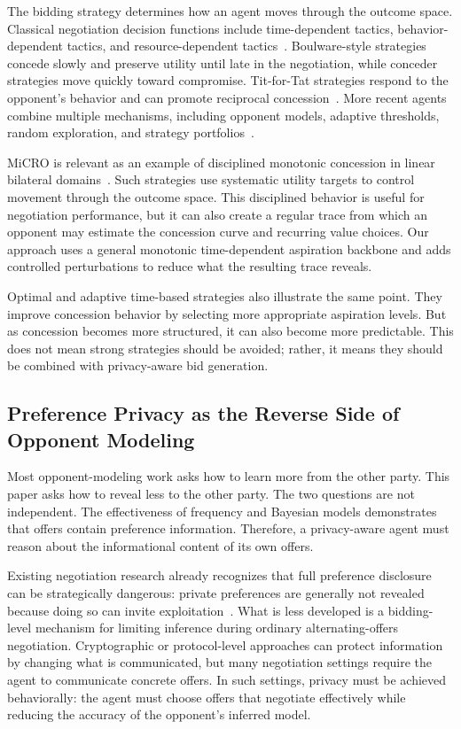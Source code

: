 \documentclass[runningheads]{llncs}
\begin{document}
The bidding strategy determines how an agent moves through the outcome space. Classical negotiation decision functions include time-dependent tactics, behavior-dependent tactics, and resource-dependent tactics~\cite{BasicAgent}. Boulware-style strategies concede slowly and preserve utility until late in the negotiation, while conceder strategies move quickly toward compromise. Tit-for-Tat strategies respond to the opponent's behavior and can promote reciprocal concession~\cite{nice_tit4tat_Baarslag2013}. More recent agents combine multiple mechanisms, including opponent models, adaptive thresholds, random exploration, and strategy portfolios~\cite{hardheaded,Iamhaggler,cuhkagent,fawkes_2013,AutoConfig}.

MiCRO is relevant as an example of disciplined monotonic concession in linear bilateral domains~\cite{micro_1}. Such strategies use systematic utility targets to control movement through the outcome space. This disciplined behavior is useful for negotiation performance, but it can also create a regular trace from which an opponent may estimate the concession curve and recurring value choices. Our approach uses a general monotonic time-dependent aspiration backbone and adds controlled perturbations to reduce what the resulting trace reveals.

Optimal and adaptive time-based strategies also illustrate the same point. They improve concession behavior by selecting more appropriate aspiration levels. But as concession becomes more structured, it can also become more predictable. This does not mean strong strategies should be avoided; rather, it means they should be combined with privacy-aware bid generation.

\subsection{Preference Privacy as the Reverse Side of Opponent Modeling}

Most opponent-modeling work asks how to learn more from the other party. This paper asks how to reveal less to the other party. The two questions are not independent. The effectiveness of frequency and Bayesian models demonstrates that offers contain preference information. Therefore, a privacy-aware agent must reason about the informational content of its own offers.

Existing negotiation research already recognizes that full preference disclosure can be strategically dangerous: private preferences are generally not revealed because doing so can invite exploitation~\cite{survey_opponentmodel,principles_negotiation}. What is less developed is a bidding-level mechanism for limiting inference during ordinary alternating-offers negotiation. Cryptographic or protocol-level approaches can protect information by changing what is communicated, but many negotiation settings require the agent to communicate concrete offers. In such settings, privacy must be achieved behaviorally: the agent must choose offers that negotiate effectively while reducing the accuracy of the opponent's inferred model.
\end{document}
